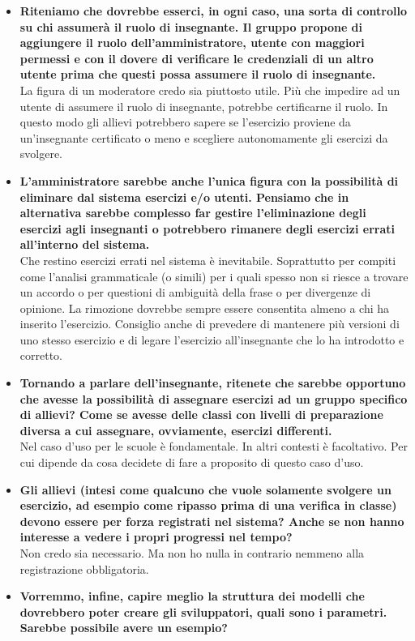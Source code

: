\documentclass[11pt,a4paper]{article}
\begin{document}
\begin{itemize}
	\item \textbf{Riteniamo che dovrebbe esserci, in ogni caso, una sorta di controllo su chi assumerà il ruolo di insegnante. Il gruppo propone di aggiungere il ruolo dell'amministratore, utente con maggiori permessi e con il dovere di verificare le credenziali di un altro utente prima che questi possa assumere il ruolo di insegnante.}\\
	La figura di un moderatore credo sia piuttosto utile. Più che impedire ad un utente di assumere il ruolo di insegnante, potrebbe certificarne il ruolo. In questo modo gli allievi potrebbero sapere se l'esercizio proviene da un'insegnante certificato o meno e scegliere autonomamente gli esercizi da svolgere.
	\item \textbf{L'amministratore sarebbe anche l'unica figura con la possibilità di eliminare dal sistema esercizi e/o utenti. Pensiamo che in alternativa sarebbe complesso far gestire l'eliminazione degli esercizi agli insegnanti o potrebbero rimanere degli esercizi errati all'interno del sistema.} \\
	Che restino esercizi errati nel sistema è inevitabile. Soprattutto per compiti come l'analisi grammaticale (o simili) per i quali spesso non si riesce a trovare un accordo o per questioni di ambiguità della frase o per divergenze di opinione.
La rimozione dovrebbe sempre essere consentita almeno a chi ha inserito l'esercizio. Consiglio anche di prevedere di mantenere più versioni di uno stesso esercizio e di legare l'esercizio all'insegnante che lo ha introdotto e corretto.
	\item \textbf{Tornando a parlare dell'insegnante, ritenete che sarebbe opportuno che avesse la possibilità di assegnare esercizi ad un gruppo specifico di allievi? Come se avesse delle classi con livelli di preparazione diversa a cui assegnare, ovviamente, esercizi differenti.} \\
	Nel caso d'uso per le scuole è fondamentale. In altri contesti è facoltativo. Per cui dipende da cosa decidete di fare a proposito di questo caso d'uso.
	\item \textbf{Gli allievi (intesi come qualcuno che vuole solamente svolgere un esercizio, ad esempio come ripasso prima di una verifica in classe) devono essere per forza registrati nel sistema? Anche se non hanno interesse a vedere i propri progressi nel tempo?} \\
	Non credo sia necessario. Ma non ho nulla in contrario nemmeno alla registrazione obbligatoria.
	\item \textbf{Vorremmo, infine, capire meglio la struttura dei modelli che dovrebbero poter creare gli sviluppatori, quali sono i parametri. Sarebbe possibile avere un esempio?} \\

\end{itemize}
\end{document}
